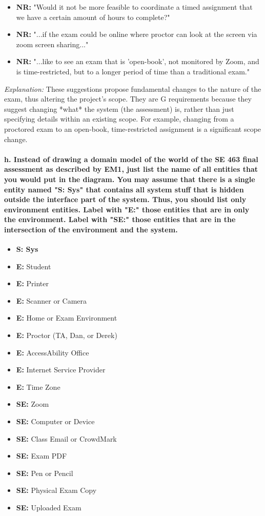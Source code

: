 \documentclass{article}
\begin{document}
\begin{itemize}
    \item \textbf{NR:} "Would it not be more feasible to coordinate a timed assignment that we have a certain amount of hours to complete?"
    \item \textbf{NR:} "...if the exam could be online where proctor can look at the screen via zoom screen sharing..."
    \item \textbf{NR:} "...like to see an exam that is 'open-book', not monitored by Zoom, and is time-restricted, but to a longer period of time than a traditional exam."
\end{itemize}

\textit{Explanation:} These suggestions propose fundamental changes to the nature of the exam, thus altering the project's scope. They are G requirements because they suggest changing *what* the system (the assessment) is, rather than just specifying details within an existing scope. For example, changing from a proctored exam to an open-book, time-restricted assignment is a significant scope change.

\paragraph{h. Instead of drawing a domain model of the world of the SE 463 final assessment as described by EM1, just list the name of all entities that you would put in the diagram. You may assume that there is a single entity named "S: Sys" that contains all system stuff that is hidden outside the interface part of the system. Thus, you should list only environment entities. Label with "E:" those entities that are in only the environment. Label with "SE:" those entities that are in the intersection of the environment and the system.}

\begin{itemize}
    \item \textbf{S: Sys}
    \item \textbf{E:} Student
    \item \textbf{E:} Printer
    \item \textbf{E:} Scanner or Camera
    \item \textbf{E:} Home or Exam Environment
    \item \textbf{E:} Proctor (TA, Dan, or Derek)
    \item \textbf{E:} AccessAbility Office
    \item \textbf{E:} Internet Service Provider
    \item \textbf{E:} Time Zone
    \item \textbf{SE:} Zoom
    \item \textbf{SE:} Computer or Device
    \item \textbf{SE:} Class Email or CrowdMark
    \item \textbf{SE:} Exam PDF
    \item \textbf{SE:} Pen or Pencil
    \item \textbf{SE:} Physical Exam Copy
    \item \textbf{SE:} Uploaded Exam
\end{itemize}
\end{document}
